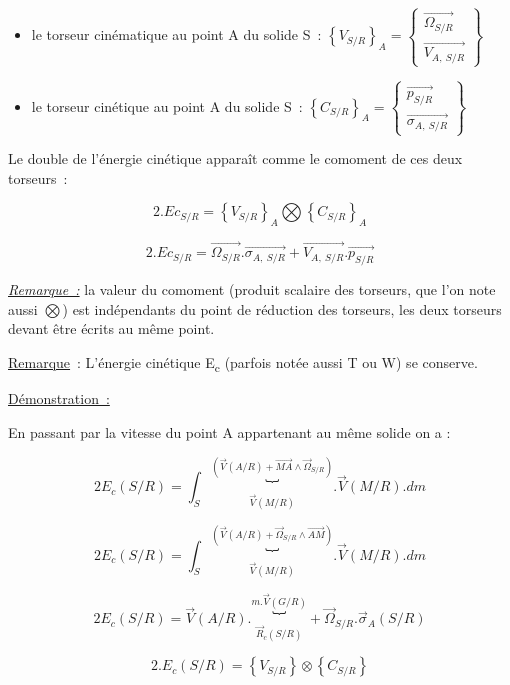 \begin{itemize}
\item
  le torseur cinématique au point A du solide S~: \(\left\{ V_{S/R} \right\}_{A} = \begin{Bmatrix} \overrightarrow{\Omega_{S/R}}\ \  \\ \overrightarrow{V_{A,\ S/R}} \end{Bmatrix}\)
\item
  le torseur cinétique au point A du solide S~: \(\left\{ C_{S/R} \right\}_{A} = \begin{Bmatrix} \overrightarrow{p_{S/R}}\ \ \  \\ \overrightarrow{\sigma_{A,\ S/R}} \end{Bmatrix}\)
\end{itemize}

Le double de l'énergie cinétique apparaît comme le comoment de ces deux torseurs~:

\[2.{Ec}_{S/R} = \left\{ V_{S/R} \right\}_{A}{\bigotimes\left\{ C_{S/R} \right\}}_{A}\]

\[2.{Ec}_{S/R} = \overrightarrow{\Omega_{S/R}}.\overrightarrow{\sigma_{A,\ S/R}} + \overrightarrow{V_{A,\ S/R}}.\overrightarrow{p_{S/R}}\]

\emph{\ul{Remarque~:}} la valeur du comoment (produit scalaire des torseurs, que l'on note aussi \(\bigotimes\)) est indépendants du point de réduction des torseurs, les deux torseurs devant être écrits au même point.

\ul{Remarque}~: L'énergie cinétique E\textsubscript{c} (parfois notée aussi T ou W) se conserve.

\ul{Démonstration~:}

En passant par la vitesse du point A appartenant au même solide on a :

\[2E_{c}(S/R) = \int_{S}^{}{\underset{\overrightarrow{V}(M/R)}{\overset{\left( \overrightarrow{V}(A/R) + \overrightarrow{MA} \land {\overrightarrow{\Omega}}_{S/R} \right)}{︸}}.\overrightarrow{V}(M/R).dm}\]

\[2E_{c}(S/R) = \int_{S}^{}{\underset{\overrightarrow{V}(M/R)}{\overset{\left( \overrightarrow{V}(A/R) + {\overrightarrow{\Omega}}_{S/R} \land \overrightarrow{AM} \right)}{︸}}.\overrightarrow{V}(M/R).dm}\]

\[2E_{c}(S/R) = \overrightarrow{V}(A/R).\underset{{\overrightarrow{R}}_{c}(S/R)}{\overset{m.\overrightarrow{V}(G/R)}{︸}} + {\overrightarrow{\Omega}}_{S/R}.{\overrightarrow{\sigma}}_{A}(S/R)\]

\[2.E_{c}(S/R) = \left\{ V_{S/R} \right\} \otimes \left\{ C_{S/R} \right\}\]

